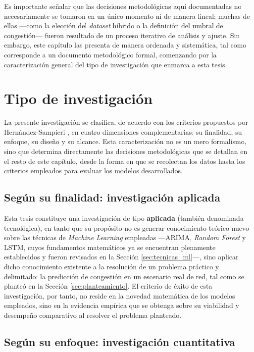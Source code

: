 \documentclass[12pt]{report}
\begin{document}
Es importante señalar que las decisiones metodológicas aquí documentadas no necesariamente se tomaron en un único momento ni de manera lineal; muchas de ellas ---como la elección del \textit{dataset} híbrido o la definición del umbral de congestión--- fueron resultado de un proceso iterativo de análisis y ajuste. Sin embargo, este capítulo las presenta de manera ordenada y sistemática, tal como corresponde a un documento metodológico formal, comenzando por la caracterización 
general del tipo de investigación que enmarca a esta tesis.

\section{Tipo de investigación}
\label{sec:tipo_investigacion}

La presente investigación se clasifica, de acuerdo con los criterios propuestos por Hernández-Sampieri \cite{hernandez2023}, en cuatro dimensiones complementarias: su finalidad, su enfoque, su diseño y su alcance. Esta caracterización no es un mero formalismo, sino que determina directamente las decisiones metodológicas que se detallan en el resto de este capítulo, desde la forma en que se recolectan los datos hasta los criterios empleados para evaluar los modelos desarrollados.

\subsection*{Según su finalidad: investigación aplicada}

Esta tesis constituye una investigación de tipo \textbf{aplicada} (también denominada tecnológica), en tanto que su propósito no es generar conocimiento teórico nuevo sobre las técnicas de \textit{Machine Learning} empleadas ---ARIMA, \textit{Random Forest} y LSTM, cuyos fundamentos matemáticos ya se encuentran plenamente establecidos y fueron revisados en la Sección \ref{sec:tecnicas_ml}---, sino aplicar dicho conocimiento existente a la resolución de un problema práctico y 
delimitado: la predicción de congestión en un escenario real de red, tal como se planteó en la Sección \ref{sec:planteamiento}. El criterio de éxito de esta investigación, por tanto, no reside en la novedad matemática de los modelos empleados, sino en la evidencia empírica que se obtenga sobre su viabilidad y desempeño comparativo al resolver el problema planteado.

\subsection*{Según su enfoque: investigación cuantitativa}
\end{document}
